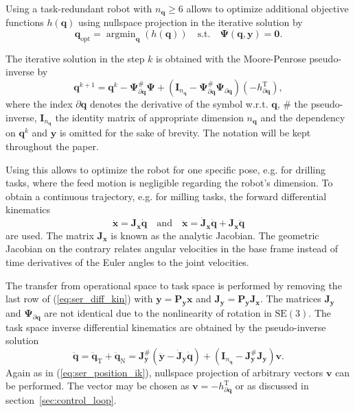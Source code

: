 \documentclass[a4paper,twoside]{article}
\newcommand{\transp}[0]{{\mathrm{T}}}
\DeclareMathOperator*{\argmin}{argmin}
\begin{document}
Using a task-redundant robot with $n_{\bm{q}} \geq 6$ allows to optimize additional objective functions $h(\bm{q})$ using nullspace projection in the iterative solution by
\begin{equation}
\bm{q}_{\mathrm{opt}}=\argmin_{\bm{q}}(h(\bm{q}))\quad\mathrm{s.t.}\quad \bm{\Psi}(\bm{q},\bm{y})=\bm{0}.
\end{equation}

The iterative solution in the step $k$ is obtained with the Moore-Penrose pseudo-inverse by
\begin{equation}
\bm{q}^{k+1}=\bm{q}^{k} - 
\bm{\Psi}_{\partial \bm{q}}^{\#}\bm{\Psi}+(\bm{I}_{n_{\bm{q}}}-\bm{\Psi}_{\partial \bm{q}}^{\#}\bm{\Psi}_{\partial \bm{q}}) (-h_{\partial \bm{q}}^\transp),
\label{eq:ser_position_ik}
\end{equation}
where the index $\partial \bm{q}$ denotes the derivative of the symbol w.r.t. $\bm{q}$, \# the pseudo-inverse, $\bm{I}_{n_{\bm{q}}}$ the identity matrix of appropriate dimension $n_{\bm{q}}$ and the dependency on $\bm{q}^{k}$ and $\bm{y}$ is omitted for the sake of brevity.
The notation will be kept throughout the paper.

Using this allows to optimize the robot for one specific pose, e.g. for drilling tasks, where the feed motion is negligible regarding the robot's dimension.
To obtain a continuous trajectory, e.g. for milling tasks, the forward differential kinematics 
\begin{equation}
\dot{\bm{x}}=\bm{J}_{\bm{x}} \dot{\bm{q}}\quad\mathrm{and}\quad \ddot{\bm{x}}=\dot{\bm{J}}_{\bm{x}} \dot{\bm{q}} + \bm{J}_{\bm{x}} \ddot{\bm{q}}
\label{eq:ser_diff_kin}
\end{equation}
are used.
The matrix $\bm{J}_{\bm{x}}$ is known as the analytic Jacobian.
The geometric Jacobian on the contrary relates angular velocities in the base frame instead of time derivatives of the Euler angles to the joint velocities.

The transfer from operational space to task space is performed by removing the last row of (\ref{eq:ser_diff_kin}) with $\bm{y}=\bm{P}_{\bm{y}} \bm{x}$ and $\bm{J}_{\bm{y}} = \bm{P}_{\bm{y}} \bm{J}_{\bm{x}}$. %
The matrices $\bm{J}_{\bm{y}}$ and $\bm{\Psi}_{\partial \bm{q}}$ are not identical due to the nonlinearity of rotation in $\mathrm{SE(3)}$.
The task space inverse differential kinematics are obtained by the pseudo-inverse solution
\begin{equation}
\ddot{\bm{q}}
=\ddot{\bm{q}}_\mathrm{T}+\ddot{\bm{q}}_\mathrm{N}
= \bm{J}_{\bm{y}}^{\#}(\ddot{\bm{y}} - \dot{\bm{J}}_{\bm{y}} \dot{\bm{q}}) + (\bm{I}_{n_{\bm{q}}}-\bm{J}_{\bm{y}}^{\#}\bm{J}_{\bm{y}}) \bm{v}.
\label{eq:ser_accel_ik}
\end{equation}
Again as in (\ref{eq:ser_position_ik}), nullspace projection of arbitrary vectors $\bm{v}$ can be performed.
The vector may be chosen as $\bm{v}=-h_{\partial \bm{q}}^\transp$ or as discussed in section~\ref{sec:control_loop}.
\end{document}

